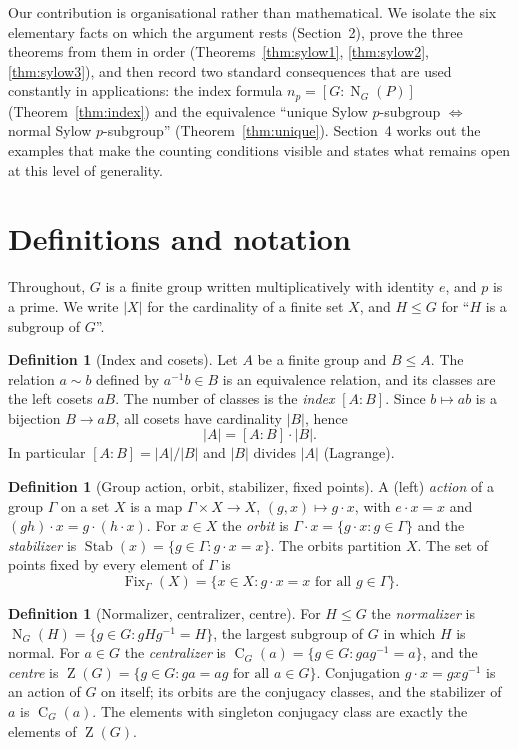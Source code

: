 \documentclass[11pt]{article}
\theoremstyle{definition}
\newtheorem{definition}[theorem]{Definition}
\theoremstyle{remark}
\newcommand{\Fix}{\operatorname{Fix}}
\newcommand{\Stab}{\operatorname{Stab}}
\newcommand{\Cent}{\operatorname{C}}
\newcommand{\Norm}{\operatorname{N}}
\newcommand{\Z}{\operatorname{Z}}
\begin{document}
Our contribution is organisational rather than mathematical. We isolate the six elementary facts on which the argument rests (Section~2), prove the three theorems from them in order (Theorems~\ref{thm:sylow1}, \ref{thm:sylow2}, \ref{thm:sylow3}), and then record two standard consequences that are used constantly in applications: the index formula $n_p=[G:\Norm_G(P)]$ (Theorem~\ref{thm:index}) and the equivalence ``unique Sylow $p$-subgroup $\Leftrightarrow$ normal Sylow $p$-subgroup'' (Theorem~\ref{thm:unique}). Section~4 works out the examples that make the counting conditions visible and states what remains open at this level of generality.

\section{Definitions and notation}

Throughout, $G$ is a finite group written multiplicatively with identity $e$, and $p$ is a prime. We write $|X|$ for the cardinality of a finite set $X$, and $H\le G$ for ``$H$ is a subgroup of $G$''.

\begin{definition}[Index and cosets]
Let $A$ be a finite group and $B\le A$. The relation $a\sim b$ defined by $a^{-1}b\in B$ is an equivalence relation, and its classes are the left cosets $aB$. The number of classes is the \emph{index} $[A:B]$. Since $b\mapsto ab$ is a bijection $B\to aB$, all cosets have cardinality $|B|$, hence
\[
|A|=[A:B]\cdot|B| .
\]
In particular $[A:B]=|A|/|B|$ and $|B|$ divides $|A|$ (Lagrange).
\end{definition}

\begin{definition}[Group action, orbit, stabilizer, fixed points]
A (left) \emph{action} of a group $\Gamma$ on a set $X$ is a map $\Gamma\times X\to X$, $(g,x)\mapsto g\cdot x$, with $e\cdot x=x$ and $(gh)\cdot x=g\cdot(h\cdot x)$. For $x\in X$ the \emph{orbit} is $\Gamma\cdot x=\{g\cdot x:g\in\Gamma\}$ and the \emph{stabilizer} is $\Stab(x)=\{g\in\Gamma: g\cdot x=x\}$. The orbits partition $X$. The set of points fixed by every element of $\Gamma$ is
\[
\Fix_\Gamma(X)=\{x\in X: g\cdot x=x \text{ for all } g\in\Gamma\}.
\]
\end{definition}

\begin{definition}[Normalizer, centralizer, centre]
For $H\le G$ the \emph{normalizer} is $\Norm_G(H)=\{g\in G: gHg^{-1}=H\}$, the largest subgroup of $G$ in which $H$ is normal. For $a\in G$ the \emph{centralizer} is $\Cent_G(a)=\{g\in G: gag^{-1}=a\}$, and the \emph{centre} is $\Z(G)=\{g\in G: ga=ag \text{ for all } a\in G\}$. Conjugation $g\cdot x=gxg^{-1}$ is an action of $G$ on itself; its orbits are the conjugacy classes, and the stabilizer of $a$ is $\Cent_G(a)$. The elements with singleton conjugacy class are exactly the elements of $\Z(G)$.
\end{definition}
\end{document}
